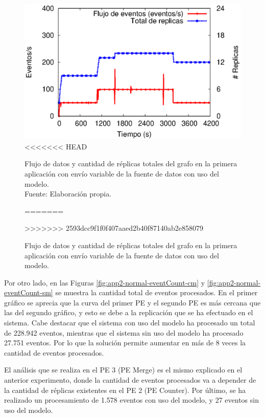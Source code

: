 \begin{figure}[!ht]
	\centering
	\captionsetup{justification=centering}
	\includegraphics[scale=0.7]{images/exp/app2/normal/cm/processSystem.eps}
<<<<<<< HEAD
    \caption[Flujo de datos y cantidad de réplicas totales del grafo en la primera aplicación con envío variable de la fuente de datos con uso del modelo.]{Flujo de datos y cantidad de réplicas totales del grafo en la primera aplicación con envío variable de la fuente de datos con uso del modelo.\\Fuente: Elaboración propia.}
=======
    \caption{Flujo de datos y cantidad de r\'eplicas totales del grafo en la primera aplicaci\'on con env\'io variable de la fuente de datos con uso del modelo.}
>>>>>>> 2593dcc9f1f0f407aaed2b40f87140ab2e858079
	\label{fig:app2-normal-processSystem-cm}
\end{figure}


Por otro lado, en las Figuras \ref{fig:app2-normal-eventCount-cm} y \ref{fig:app2-normal-eventCount-sm} se muestra la cantidad total de eventos procesados. En el primer gr\'afico se aprecia que la curva del primer PE y el segundo PE es m\'as cercana que las del segundo gr\'afico, y esto se debe a la replicaci\'on que se ha efectuado en el sistema. Cabe destacar que el sistema con uso del modelo ha procesado un total de 228.942 eventos, mientras que el sistema sin uso del modelo ha procesado 27.751 eventos. Por lo que la soluci\'on permite aumentar en m\'as de 8 veces la cantidad de eventos procesados.

El an\'alisis que se realiza en el PE 3 (PE Merge) es el mismo explicado en el anterior experimento, donde la cantidad de eventos procesados va a depender de la cantidad de r\'eplicas existentes en el PE 2 (PE Counter). Por \'ultimo, se ha realizado un procesamiento de 1.578 eventos con uso del modelo, y 27 eventos sin uso del modelo.

